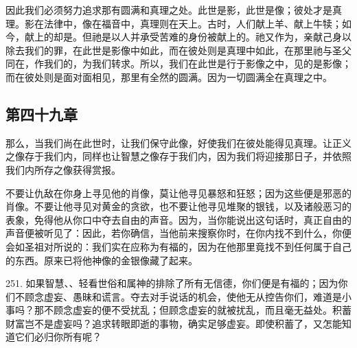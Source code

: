 因此我们必须努力追求那有圆满和真理之处。此世是影，此世是像；彼处才是真理。影在法律中，像在福音中，真理则在天上。古时，人们献上羊、献上牛犊；如今，献上的却是。但祂是以人并承受苦难的身份被献上的。祂又作为，亲献己身以除去我们的罪，在此世是影像中如此，而在彼处则是真理中如此，在那里祂与圣父同在，作我们的，为我们转求。所以，我们在此世是行于影像之中，见的是影像；而在彼处则是面对面相见，那里有全然的圆满。因为一切圆满全在真理之中。\par


\subsection{第四十九章}

\par

那么，当我们尚在此世时，让我们保守此像，好使我们在彼处能得见真理。让正义之像存于我们内，同样也让智慧之像存于我们内，因为我们将迎接那日子，并依照我们内所存之像获得赏报。\par

不要让仇敌在你身上寻见他的肖像，莫让他寻见暴怒和狂怒；因为这些便是邪恶的肖像。不要让他寻见对黄金的贪欲，也不要让他寻见堆聚的银钱，以及诸般恶习的表象，免得他从你口中夺去自由的声音。因为，当你能说出这句话时，真正自由的声音便被听见了：因此，若你确信，当他前来搜察你时，在你内找不到什么，你便会如圣祖对所说的：我们实在应称为有福的，因为在他那里竟找不到任何属于自己的东西。原来已将他神像的金银像藏了起来。\par

251. 如果智慧、、轻看世俗和属神的排除了所有无信德，你们便是有福的；因为你们不顾念虚妄、愚昧和谎言。夺去对手说话的机会，使他无从控告你们，难道是小事吗？那不顾念虚妄的便不受扰乱；但顾念虚妄的就被扰乱，而且毫无益处。积蓄财富岂不是虚妄吗？追求转眼即逝的事物，确实足够虚妄。即使积蓄了，又怎能知道它们必归你所有呢？\par

